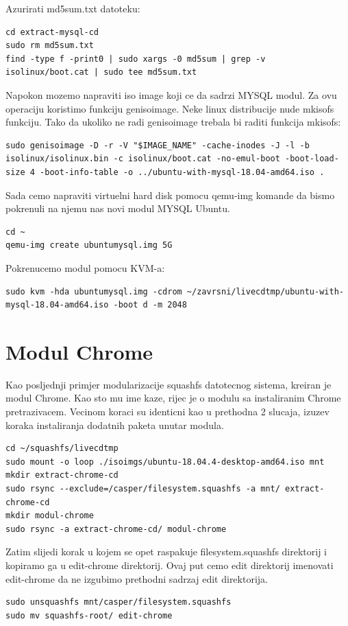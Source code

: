 \documentclass[12pt,vi]{mitthesis}
\begin{document}
\noindent
Azurirati md5sum.txt datoteku:
\begin{lstlisting}[style=BashInputStyle]
cd extract-mysql-cd
sudo rm md5sum.txt
find -type f -print0 | sudo xargs -0 md5sum | grep -v isolinux/boot.cat | sudo tee md5sum.txt
\end{lstlisting}

\noindent
Napokon mozemo napraviti iso image koji ce da sadrzi MYSQL modul. Za ovu operaciju koristimo funkciju genisoimage. Neke linux distribucije nude mkisofs funkciju. Tako da ukoliko ne radi genisoimage trebala bi raditi funkcija mkisofs:
\begin{lstlisting}[style=BashInputStyle]
sudo genisoimage -D -r -V "$IMAGE_NAME" -cache-inodes -J -l -b isolinux/isolinux.bin -c isolinux/boot.cat -no-emul-boot -boot-load-size 4 -boot-info-table -o ../ubuntu-with-mysql-18.04-amd64.iso .
\end{lstlisting}

\noindent
Sada cemo napraviti virtuelni hard disk pomocu qemu-img komande da bismo pokrenuli na njemu nas novi modul MYSQL Ubuntu.
\begin{lstlisting}[style=BashInputStyle]
cd ~
qemu-img create ubuntumysql.img 5G
\end{lstlisting}

\noindent 
Pokrenucemo modul pomocu KVM-a:
\begin{lstlisting}[style=BashInputStyle]
sudo kvm -hda ubuntumysql.img -cdrom ~/zavrsni/livecdtmp/ubuntu-with-mysql-18.04-amd64.iso -boot d -m 2048
\end{lstlisting}


\chapter*{Modul Chrome}
Kao posljednji primjer modularizacije squashfs datotecnog sistema, kreiran je modul Chrome. Kao sto mu ime kaze, rijec je o modulu sa instaliranim Chrome pretrazivacem. Vecinom koraci su identicni kao u prethodna 2 slucaja, izuzev koraka instaliranja dodatnih paketa unutar modula.\\
\begin{lstlisting}[style=BashInputStyle]
cd ~/squashfs/livecdtmp
sudo mount -o loop ./isoimgs/ubuntu-18.04.4-desktop-amd64.iso mnt
mkdir extract-chrome-cd
sudo rsync --exclude=/casper/filesystem.squashfs -a mnt/ extract-chrome-cd
mkdir modul-chrome
sudo rsync -a extract-chrome-cd/ modul-chrome
\end{lstlisting}
Zatim slijedi korak u kojem se opet raspakuje filesystem.squashfs direktorij i kopiramo ga u edit-chrome direktorij. Ovaj put cemo edit direktorij imenovati edit-chrome da ne izgubimo prethodni sadrzaj edit direktorija.\\
\begin{lstlisting}[style=BashInputStyle]
sudo unsquashfs mnt/casper/filesystem.squashfs
sudo mv squashfs-root/ edit-chrome
\end{lstlisting}
\end{document}
